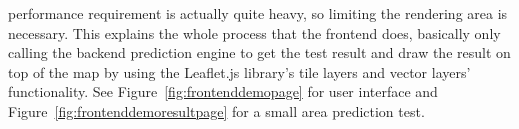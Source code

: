 performance requirement is actually quite heavy, so limiting the rendering area is necessary. This explains the whole process that the frontend does, basically only calling the backend prediction engine to get the test result and draw the result on top of the map by using the Leaflet.js library’s tile layers and vector layers’ functionality. See Figure~\ref{fig:frontenddemopage} for user interface and Figure~\ref{fig:frontenddemoresultpage} for a small area prediction test.

